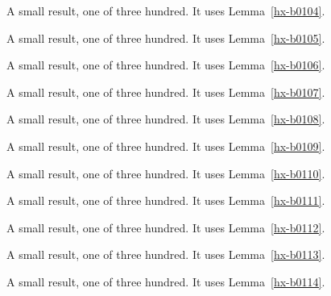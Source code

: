 \begin{lemma}[Bulk 105]\label{hx-b0105}
A small result, one of three hundred. It uses Lemma~\ref{hx-b0104}.
\end{lemma}

\begin{lemma}[Bulk 106]\label{hx-b0106}
A small result, one of three hundred. It uses Lemma~\ref{hx-b0105}.
\end{lemma}

\begin{lemma}[Bulk 107]\label{hx-b0107}
A small result, one of three hundred. It uses Lemma~\ref{hx-b0106}.
\end{lemma}

\begin{lemma}[Bulk 108]\label{hx-b0108}
A small result, one of three hundred. It uses Lemma~\ref{hx-b0107}.
\end{lemma}

\begin{lemma}[Bulk 109]\label{hx-b0109}
A small result, one of three hundred. It uses Lemma~\ref{hx-b0108}.
\end{lemma}

\begin{lemma}[Bulk 110]\label{hx-b0110}
A small result, one of three hundred. It uses Lemma~\ref{hx-b0109}.
\end{lemma}

\begin{lemma}[Bulk 111]\label{hx-b0111}
A small result, one of three hundred. It uses Lemma~\ref{hx-b0110}.
\end{lemma}

\begin{lemma}[Bulk 112]\label{hx-b0112}
A small result, one of three hundred. It uses Lemma~\ref{hx-b0111}.
\end{lemma}

\begin{lemma}[Bulk 113]\label{hx-b0113}
A small result, one of three hundred. It uses Lemma~\ref{hx-b0112}.
\end{lemma}

\begin{lemma}[Bulk 114]\label{hx-b0114}
A small result, one of three hundred. It uses Lemma~\ref{hx-b0113}.
\end{lemma}

\begin{lemma}[Bulk 115]\label{hx-b0115}
A small result, one of three hundred. It uses Lemma~\ref{hx-b0114}.
\end{lemma}

